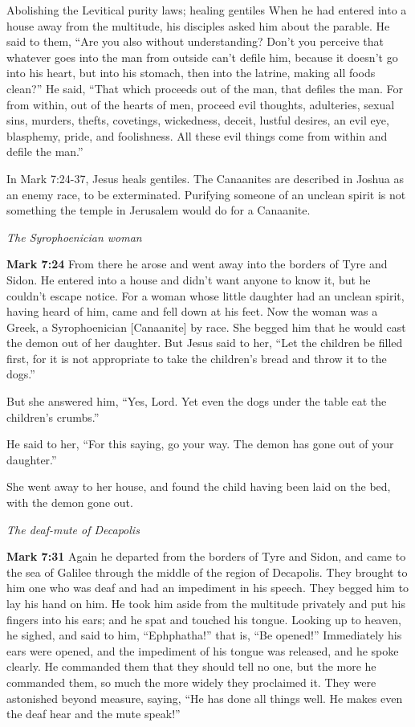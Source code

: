 \documentclass[10pt,twoside]{article} %
\newcommand{\quotesize}{\normalsize{}}
\newcommand{\comm}[1]{\begingroup \color{black!50} #1\endgroup}
\newenvironment{quotetext}{\begingroup\quotesize}{\endgroup}
\newcommand{\bible}[2]{\begin{quotetext}\textbf{#1} #2\end{quotetext}}
\newcommand{\gospelmark}[2]{\bible{Mark #1}{#2}}
\newcommand{\subhead}[1]{\emph{#1}\par}
\begin{document}
\begin{section}{Abolishing the Levitical purity laws; healing gentiles}
{  When he had entered into a house away from the multitude, his disciples asked him about the parable.   He said to them, ``Are you also without understanding? Don't you perceive that whatever goes into the man from outside can't defile him,    because it doesn't go into his heart, but into his stomach, then into the latrine, making all foods clean?''   He said, ``That which proceeds out of the man, that defiles the man.    For from within, out of the hearts of men, proceed evil thoughts, adulteries, sexual sins, murders, thefts,    covetings, wickedness, deceit, lustful desires, an evil eye, blasphemy, pride, and foolishness.    All these evil things come from within and defile the man.''
}

\comm{
In Mark 7:24-37, Jesus heals gentiles. The Canaanites are described in Joshua as an enemy race, to be exterminated. Purifying someone
of an unclean spirit is not something the temple in Jerusalem would do for a Canaanite.
}

\subhead{The Syrophoenician woman}

\gospelmark{7:24}{
  From there he arose and went away into the borders of Tyre and Sidon. He entered into a house and didn't want anyone to know it, but he couldn't escape notice.   For a woman whose little daughter had an unclean spirit, having heard of him, came and fell down at his feet.   Now the woman was a Greek, a Syrophoenician [Canaanite] by race. She begged him that he would cast the demon out of her daughter.   But Jesus said to her, ``Let the children be filled first, for it is not appropriate to take the children's bread and throw it to the dogs.''

  But she answered him, ``Yes, Lord. Yet even the dogs under the table eat the children's crumbs.''

  He said to her, ``For this saying, go your way. The demon has gone out of your daughter.''

  She went away to her house, and found the child having been laid on the bed, with the demon gone out.
}

\subhead{The deaf-mute of Decapolis}

\gospelmark{7:31}{
  Again he departed from the borders of Tyre and Sidon, and came to the sea of Galilee through the middle of the region of Decapolis.   They brought to him one who was deaf and had an impediment in his speech. They begged him to lay his hand on him.   He took him aside from the multitude privately and put his fingers into his ears; and he spat and touched his tongue.   Looking up to heaven, he sighed, and said to him, ``Ephphatha!'' that is, ``Be opened!''   Immediately his ears were opened, and the impediment of his tongue was released, and he spoke clearly.   He commanded them that they should tell no one, but the more he commanded them, so much the more widely they proclaimed it.   They were astonished beyond measure, saying, ``He has done all things well. He makes even the deaf hear and the mute speak!''
}


\end{section}
\end{document}
